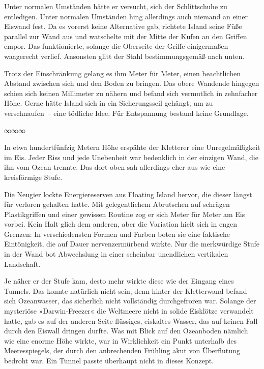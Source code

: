 Unter normalen Umständen hätte er versucht, sich der Schlittschuhe zu entledigen. Unter normalen Umständen hing allerdings auch niemand an einer Eiswand fest. Da es vorerst keine Alternative gab, richtete Island seine Füße parallel zur Wand aus und watschelte mit der Mitte der Kufen an den Griffen empor. Das funktionierte, solange die Oberseite der Griffe einigermaßen waagerecht verlief. Ansonsten glitt der Stahl bestimmungsgemäß nach unten.

Trotz der Einschränkung gelang es ihm Meter für Meter, einen beachtlichen Abstand zwischen sich und den Boden zu bringen. Das obere Wandende hingegen schien sich keinen Millimeter zu nähern und befand sich vermutlich in zehnfacher Höhe. Gerne hätte Island sich in ein Sicherungsseil gehängt, um zu verschnaufen~– eine tödliche Idee. Für Entspannung bestand keine Grundlage.

\begin{center}
∞∞∞
\end{center}

In etwa hundertfünfzig Metern Höhe erspähte der Kletterer eine Unregelmäßigkeit im Eis. Jeder Riss und jede Unebenheit war bedenklich in der einzigen Wand, die ihn vom Ozean trennte. Das dort oben sah allerdings eher aus wie eine kreisförmige Stufe.

Die Neugier lockte Energiereserven aus Floating Island hervor, die dieser längst für verloren gehalten hatte. Mit gelegentlichem Abrutschen auf schrägen Plastikgriffen und einer gewissen Routine zog er sich Meter für Meter am Eis vorbei. Kein Halt glich dem anderen, aber die Variation hielt sich in engen Grenzen: In verschiedensten Formen und Farben boten sie eine faktische Eintönigkeit, die auf Dauer nervenzermürbend wirkte. Nur die merkwürdige Stufe in der Wand bot Abwechslung in einer scheinbar unendlichen vertikalen Landschaft.

Je näher er der Stufe kam, desto mehr wirkte diese wie der Eingang eines Tunnels. Das konnte natürlich nicht sein, denn hinter der Kletterwand befand sich Ozeanwasser, das sicherlich nicht vollständig durchgefroren war. Solange der mysteriöse »Darwin-Freezer« die Weltmeere nicht in solide Eisklötze verwandelt hatte, gab es auf der anderen Seite flüssiges, eiskaltes Wasser, das auf keinen Fall durch den Eiswall dringen durfte. Was mit Blick auf den Ozeanboden nämlich wie eine enorme Höhe wirkte, war in Wirklichkeit ein Punkt unterhalb des Meeresspiegels, der durch den anbrechenden Frühling akut von Überflutung bedroht war. Ein Tunnel passte überhaupt nicht in dieses Konzept.

